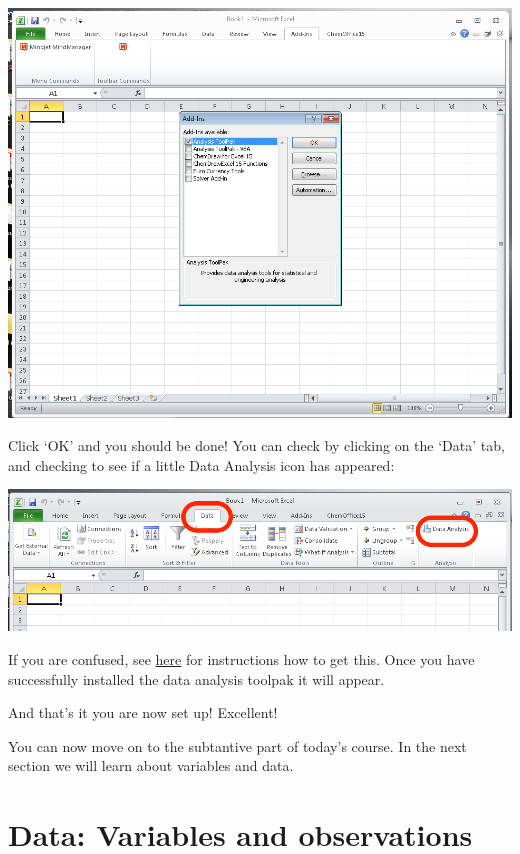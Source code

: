 \documentclass[]{book}
\theoremstyle{definition}
\theoremstyle{definition}
\theoremstyle{definition}
\theoremstyle{remark}
\begin{document}
\includegraphics{imgs/install_toolpak_after_go_popup.png}

Click `OK' and you should be done! You can check by clicking on the
`Data' tab, and checking to see if a little Data Analysis icon has
appeared:

\includegraphics{imgs/data_tab_analysis_appears.png}

If you are confused, see
\href{https://support.office.com/en-gb/article/Load-the-Analysis-ToolPak-6a63e598-cd6d-42e3-9317-6b40ba1a66b4}{here}
for instructions how to get this. Once you have successfully installed
the data analysis toolpak it will appear.

And that's it you are now set up! Excellent!

You can now move on to the subtantive part of today's course. In the
next section we will learn about variables and data.

\hypertarget{data-variables-and-observations}{%
\section{Data: Variables and
observations}\label{data-variables-and-observations}}
\end{document}
